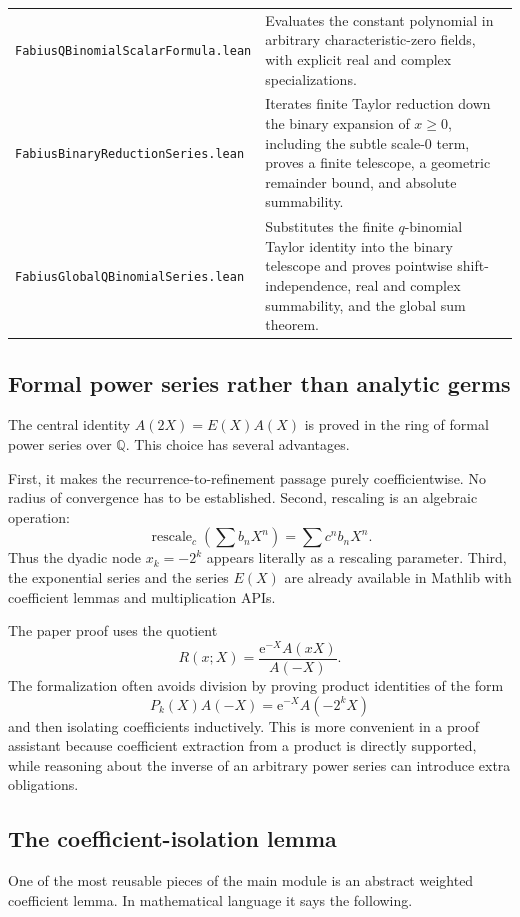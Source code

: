 \documentclass[11pt,oneside]{article}
\theoremstyle{definition}
\theoremstyle{remark}
\newcommand{\Q}{\mathbb Q}
\newcommand{\e}{\mathrm e}
\begin{document}
\begin{longtable}{@{}L{0.37\textwidth}L{0.56\textwidth}@{}}
\texttt{FabiusQBinomialScalarFormula.lean}
& Evaluates the constant polynomial in arbitrary characteristic-zero fields,
with explicit real and complex specializations.\\[0.35em]
\texttt{FabiusBinaryReductionSeries.lean}
& Iterates finite Taylor reduction down the binary expansion of $x\ge0$,
including the subtle scale-$0$ term, proves a finite telescope, a geometric
remainder bound, and absolute summability.\\[0.35em]
\texttt{FabiusGlobalQBinomialSeries.lean}
& Substitutes the finite $q$-binomial Taylor identity into the binary
telescope and proves pointwise shift-independence, real and complex
summability, and the global sum theorem.\\
\bottomrule
\end{longtable}

\subsection{Formal power series rather than analytic germs}

The central identity $A(2X)=E(X)A(X)$ is proved in the ring of formal power
series over $\Q$.  This choice has several advantages.

First, it makes the recurrence-to-refinement passage purely coefficientwise.
No radius of convergence has to be established.  Second, rescaling is an
algebraic operation:
\[
 \operatorname{rescale}_c\!\left(\sum b_nX^n\right)
 =\sum c^nb_nX^n.
\]
Thus the dyadic node $x_k=-2^k$ appears literally as a rescaling parameter.
Third, the exponential series and the series $E(X)$ are already available in
Mathlib with coefficient lemmas and multiplication APIs.

The paper proof uses the quotient
\[
 R(x;X)=\frac{\e^{-X}A(xX)}{A(-X)}.
\]
The formalization often avoids division by proving product identities of the
form
\[
 P_k(X)A(-X)=\e^{-X}A(-2^kX)
\]
and then isolating coefficients inductively.  This is more convenient in a
proof assistant because coefficient extraction from a product is directly
supported, while reasoning about the inverse of an arbitrary power series
can introduce extra obligations.

\subsection{The coefficient-isolation lemma}

One of the most reusable pieces of the main module is an abstract weighted
coefficient lemma.  In mathematical language it says the following.
\end{document}
